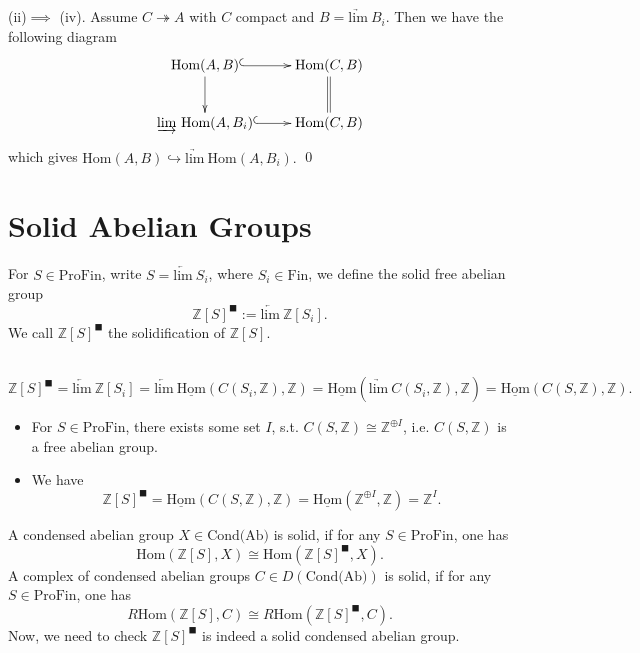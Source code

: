 \documentclass[UTF8,12,a4paper]{ctexart}
\theoremstyle{definition}
\begin{document}
(ii)$\implies$ (iv). Assume $C\twoheadrightarrow A$ with $C $ compact and $B=\underrightarrow{\text{lim}}\  B_i$. Then we have the following diagram
\begin{equation*}
\xymatrix{
	\text{Hom}(A,B) \ar@{^{(}->}[r]
\ar[d] & \text{Hom}(C,B) \ar@{=}[d] \\
\underrightarrow{\text{lim}}\ \text{Hom}(A,B_i)  \ar@{^{(}->}[r]
&  \text{Hom}(C,B)   
}
\end{equation*}
which gives $	\text{Hom}(A,B)\hookrightarrow \underrightarrow{\text{lim}}\ \text{Hom}(A,B_i) .$
\qed










\newpage
\section{Solid Abelian Groups}
\dfn 
For $S\in\text{ProFin}$, write $S=\underleftarrow{\text{lim}}\ 
 S_i$, where $S_i\in \text{Fin}$, we define the solid free abelian group
 $$
 \mathbb{Z}[S]^{\blacksquare}:=\underleftarrow{\text{lim}}\ \mathbb{Z}[S_i].
 $$
We call $ \mathbb{Z}[S]^{\blacksquare}$ the solidification of $\mathbb{Z}[S]$.

\rem~\\
$
 \mathbb{Z}[S]^{\blacksquare}=\underleftarrow{\text{lim}}\ \mathbb{Z}[S_i]
 =\underleftarrow{\text{lim}}\ \underline{\text{Hom}}(C(S_i,\mathbb{Z}),\mathbb{Z})
 =\underline{\text{Hom}}(\underrightarrow{\text{lim}}\ C(S_i,\mathbb{Z}),\mathbb{Z})
 =\underline{\text{Hom}}(C(S,\mathbb{Z}),\mathbb{Z}).
$

\prop 
\begin{itemize}
	\item [(i)]For $S\in\text{ProFin}$, there exists some set $I$, s.t. $C(S,\mathbb{Z})\cong \mathbb{Z}^{\oplus I}$, i.e. $C(S,\mathbb{Z})$ is a free abelian group.
	\item [(ii)]We have
	$$\mathbb{Z}[S]^{\blacksquare}=\underline{\text{Hom}}(C(S,\mathbb{Z}),\mathbb{Z})=\underline{\text{Hom}}(\mathbb{Z}^{\oplus I},\mathbb{Z})=\mathbb{Z}^I.$$
\end{itemize}





\dfn 
A condensed abelian group $X\in\text{Cond(Ab)}$ is solid, if for any $S\in\text{ProFin}$, one has
$$
\text{Hom}(\mathbb{Z}[S],X)\cong \text{Hom}(\mathbb{Z}[S]^{\blacksquare},X).
$$
A complex of condensed abelian groups $C\in D(\text{Cond(Ab)})$ is solid, if for any $S\in\text{ProFin}$, one has
$$
R\text{Hom}(\mathbb{Z}[S],C)\cong R\text{Hom}(\mathbb{Z}[S]^{\blacksquare},C).
$$
Now, we need to check $\mathbb{Z}[S]^{\blacksquare}$ is indeed a solid condensed abelian group.
\end{document}
